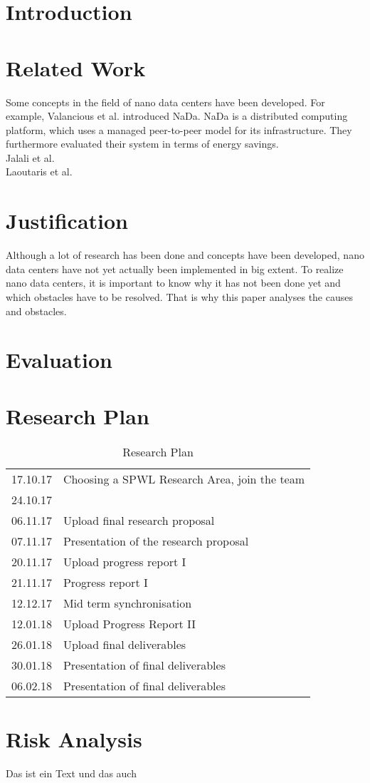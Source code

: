 \section{Introduction} %


\section{Related Work} %
Some concepts in the field of nano data centers have been developed. For example, Valancious et al. introduced NaDa. NaDa is a distributed computing platform, which uses a managed peer-to-peer model for its infrastructure. They furthermore evaluated their system in terms of energy savings. \\
Jalali et al. \\
Laoutaris et al. \\

\section{Justification} %
Although a lot of research has been done and concepts have been developed, nano data centers have not yet actually been implemented in big extent. To realize nano data centers, it is important to know why it has not been done yet and which obstacles have to be resolved. That is why this paper analyses the causes and obstacles.


\section{Evaluation} %


\section{Research Plan} %
\begin{table}[H]
  \caption{Research Plan}
  \label{tab:researchPlan}
  \begin{tabular}{ll}
    \toprule
    17.10.17 & Choosing a SPWL Research Area, join the team \\
    24.10.17 & \\
    06.11.17 & Upload final research proposal \\
    07.11.17 & Presentation of the research proposal \\
    20.11.17 & Upload progress report I \\
    21.11.17 & Progress report I \\
    12.12.17 & Mid term synchronisation \\
    12.01.18 & Upload Progress Report II \\
    26.01.18 & Upload final deliverables \\
    30.01.18 & Presentation of final deliverables \\
    06.02.18 & Presentation of final deliverables \\
    \bottomrule
  \end{tabular}
\end{table}

\section{Risk Analysis} %
Das ist ein Text \cite{DBLP:conf/conext/ValanciusLMDR09} und das auch \cite{DBLP:journals/sigmetrics/JalaliAVHAT14}

\appendix

